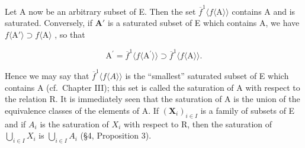 Let A now be an arbitrary subset of E. Then the set \(\overline{f}^1\langle f\langle \mathrm{A}\rangle \rangle\) contains A and is saturated. Conversely, if \(\mathbf{A}'\) is a saturated subset of E which contains A, we have \(f\langle \mathrm{A}'\rangle \supset f\langle \mathrm{A}\rangle\) , so that

\[
\mathrm{A} ^ {\prime} = \overline {{f}} ^ {1} \langle f \langle \mathrm{A} ^ {\prime} \rangle \rangle \supset \overline {{f}} ^ {1} \langle f \langle \mathrm{A} \rangle \rangle .
\]

Hence we may say that \(\overline{f}^1\langle f\langle A\rangle \rangle\) is the ``smallest'' saturated subset of E which contains A (cf.~Chapter III); this set is called the saturation of A with respect to the relation R. It is immediately seen that the saturation of A is the union of the equivalence classes of the elements of A. If \((\mathbf{X}_{i})_{i\in I}\) is a family of subsets of E and if \(A_{i}\) is the saturation of \(X_{i}\) with respect to R, then the saturation of \(\bigcup_{i\in I}X_{i}\) is \(\bigcup_{i\in I}A_{i}\) (§4, Proposition 3).

